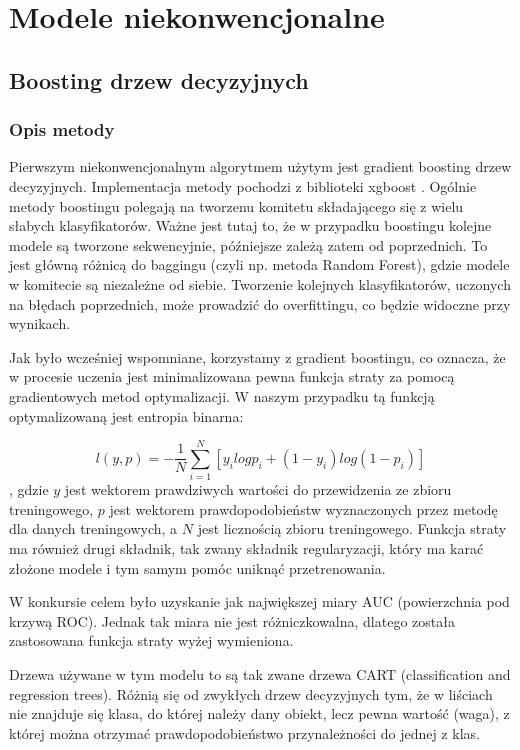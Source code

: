 \documentclass[12pt]{article}
\begin{document}
\section{Modele niekonwencjonalne}

\subsection{Boosting drzew decyzyjnych}

\subsubsection{Opis metody}

Pierwszym niekonwencjonalnym algorytmem użytym jest gradient boosting drzew decyzyjnych. Implementacja metody pochodzi z biblioteki xgboost \cite{xgboost}. Ogólnie metody boostingu polegają na tworzenu komitetu składającego się z wielu słabych klasyfikatorów. Ważne jest tutaj to, że w przypadku boostingu kolejne modele są tworzone sekwencyjnie, późniejsze zależą zatem od poprzednich. To jest główną różnicą do baggingu (czyli np. metoda Random Forest), gdzie modele w komitecie są niezależne od siebie. Tworzenie kolejnych klasyfikatorów, uczonych na błędach poprzednich, może prowadzić do overfittingu, co będzie widoczne przy wynikach.

Jak było wcześniej wspomniane, korzystamy z gradient boostingu, co oznacza, że w procesie uczenia jest minimalizowana pewna funkcja straty za pomocą gradientowych metod optymalizacji. W naszym przypadku tą funkcją optymalizowaną jest entropia binarna:

\begin{equation}
    l(y, p) = -\frac{1}{N} \sum_{i = 1}^{N} \left[ y_i log p_i + (1 - y_i) log (1 - p_i) \right]
\end{equation},
gdzie $y$ jest wektorem prawdziwych wartości do przewidzenia ze zbioru treningowego, $p$ jest wektorem prawdopodobieństw wyznaczonych przez metodę dla danych treningowych, a $N$ jest licznością zbioru treningowego. Funkcja straty ma również drugi składnik, tak zwany składnik regularyzacji, który ma karać złożone modele i tym samym pomóc uniknąć przetrenowania.

W konkursie celem było uzyskanie jak największej miary AUC (powierzchnia pod krzywą ROC). Jednak tak miara nie jest różniczkowalna, dlatego została zastosowana funkcja straty wyżej wymieniona. 

Drzewa używane w tym modelu to są tak zwane drzewa CART (classification and regression trees). Różnią się od zwykłych drzew decyzyjnych tym, że w liściach nie znajduje się klasa, do której należy dany obiekt, lecz pewna wartość (waga), z której można otrzymać prawdopodobieństwo przynależności do jednej z klas.
\end{document}
